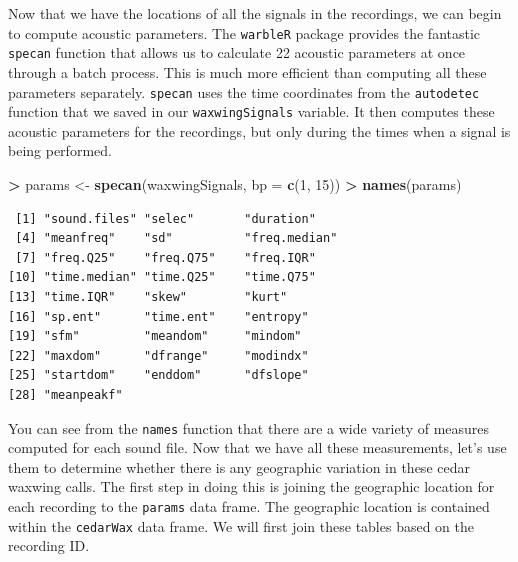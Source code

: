 \documentclass[
]{krantz}
\makeatletter
\newenvironment{Shaded}{\begin{snugshade}}{\end{snugshade}}
\newcommand{\DataTypeTok}[1]{\textcolor[rgb]{0.27,0.27,0.27}{#1}}
\newcommand{\DecValTok}[1]{\textcolor[rgb]{0.06,0.06,0.06}{#1}}
\newcommand{\KeywordTok}[1]{\textcolor[rgb]{0.27,0.27,0.27}{\textbf{#1}}}
\newcommand{\NormalTok}[1]{#1}
\newcommand{\OperatorTok}[1]{\textcolor[rgb]{0.43,0.43,0.43}{\textbf{#1}}}
\newcommand{\StringTok}[1]{\textcolor[rgb]{0.5,0.5,0.5}{#1}}
\newenvironment{kframe}{%
\medskip{}
\setlength{\fboxsep}{.8em}
 \def\at@end@of@kframe{}%
 \ifinner\ifhmode%
  \def\at@end@of@kframe{\end{minipage}}%
  \begin{minipage}{\columnwidth}%
 \fi\fi%
 \def\FrameCommand##1{\hskip\@totalleftmargin \hskip-\fboxsep
 \colorbox{shadecolor}{##1}\hskip-\fboxsep
     \hskip-\linewidth \hskip-\@totalleftmargin \hskip\columnwidth}%
 \MakeFramed {\advance\hsize-\width
   \@totalleftmargin\z@ \linewidth\hsize
   \@setminipage}}%
 {\par\unskip\endMakeFramed%
 \at@end@of@kframe}
\renewenvironment{Shaded}{\begin{kframe}}{\end{kframe}}
\makeatother
\begin{document}
Now that we have the locations of all the signals in the recordings, we can begin to compute acoustic parameters. The \texttt{warbleR} package provides the fantastic \texttt{specan} function that allows us to calculate 22 acoustic parameters at once through a batch process. This is much more efficient than computing all these parameters separately. \texttt{specan} uses the time coordinates from the \texttt{autodetec} function that we saved in our \texttt{waxwingSignals} variable. It then computes these acoustic parameters for the recordings, but only during the times when a signal is being performed.

\begin{Shaded}
\begin{Highlighting}[]
\OperatorTok{\textgreater{}}\StringTok{ }\NormalTok{params \textless{}{-}}\StringTok{ }\KeywordTok{specan}\NormalTok{(waxwingSignals, }\DataTypeTok{bp =} \KeywordTok{c}\NormalTok{(}\DecValTok{1}\NormalTok{, }\DecValTok{15}\NormalTok{)) }
\OperatorTok{\textgreater{}}\StringTok{ }\KeywordTok{names}\NormalTok{(params) }
\end{Highlighting}
\end{Shaded}

\begin{verbatim}
 [1] "sound.files" "selec"       "duration"   
 [4] "meanfreq"    "sd"          "freq.median"
 [7] "freq.Q25"    "freq.Q75"    "freq.IQR"   
[10] "time.median" "time.Q25"    "time.Q75"   
[13] "time.IQR"    "skew"        "kurt"       
[16] "sp.ent"      "time.ent"    "entropy"    
[19] "sfm"         "meandom"     "mindom"     
[22] "maxdom"      "dfrange"     "modindx"    
[25] "startdom"    "enddom"      "dfslope"    
[28] "meanpeakf"  
\end{verbatim}

You can see from the \texttt{names} function that there are a wide variety of measures computed for each sound file. Now that we have all these measurements, let's use them to determine whether there is any geographic variation in these cedar waxwing calls. The first step in doing this is joining the geographic location for each recording to the \texttt{params} data frame. The geographic location is contained within the \texttt{cedarWax} data frame. We will first join these tables based on the recording ID.
\end{document}
